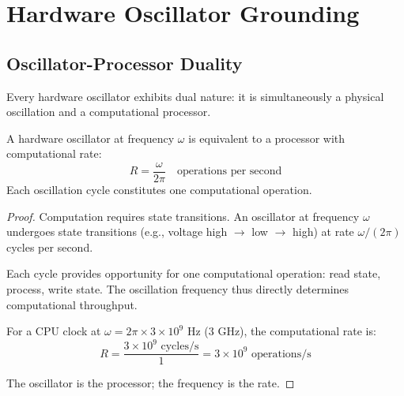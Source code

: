 \section{Hardware Oscillator Grounding}
\label{sec:hardware}

\subsection{Oscillator-Processor Duality}

Every hardware oscillator exhibits dual nature: it is simultaneously a physical oscillation and a computational processor.

\begin{proposition}
\label{prop:oscillator_processor}
A hardware oscillator at frequency $\omega$ is equivalent to a processor with computational rate:
\begin{equation}
R = \frac{\omega}{2\pi} \quad \text{operations per second}
\end{equation}
Each oscillation cycle constitutes one computational operation.
\end{proposition}

\begin{proof}
Computation requires state transitions. An oscillator at frequency $\omega$ undergoes state transitions (e.g., voltage high $\to$ low $\to$ high) at rate $\omega/(2\pi)$ cycles per second.

Each cycle provides opportunity for one computational operation: read state, process, write state. The oscillation frequency thus directly determines computational throughput.

For a CPU clock at $\omega = 2\pi \times 3 \times 10^9$ Hz (3 GHz), the computational rate is:
\begin{equation}
R = \frac{3 \times 10^9 \text{ cycles/s}}{1} = 3 \times 10^9 \text{ operations/s}
\end{equation}

The oscillator is the processor; the frequency is the rate.
\end{proof}


